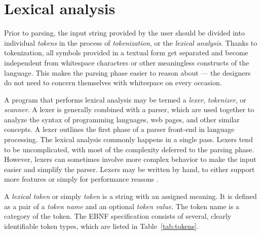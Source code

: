 \documentclass[english,bachelors,forcepolishlogotype]{wizthesis}
\begin{document}
\section{Lexical analysis} \label{sec:lexing}

Prior to parsing, the input string provided by the user should be divided into
individual \emph{tokens} in the process of \emph{tokenization}, or the
\emph{lexical analysis}. Thanks to tokenization, all symbols provided in a
textual form get separated and become independent from whitespace characters or
other meaningless constructs of the language. This makes the parsing phase
easier to reason about --- the designers do not need to concern themselves with
whitespace on every occasion.

A program that performs lexical analysis may be termed a \emph{lexer},
\emph{tokenizer}, or \emph{scanner}. A lexer is generally combined with a
parser, which are used together to analyze the syntax of programming languages,
web pages, and other similar concepts. A lexer outlines the first phase of a
parser front-end in language processing. The lexical analysis commonly happens
in a single pass. Lexers tend to be uncomplicated, with most of the complexity
deferred to the parsing phase. However, lexers can sometimes involve more
complex behavior to make the input easier and simplify the parser. Lexers may be
written by hand, to either support more features or simply for performance
reasons \cite{sipser-2009}.

A \emph{lexical token} or simply \emph{token} is a string with an assigned
meaning. It is defined as a pair of a \emph{token name} and an optional
\emph{token value}. The token name is a category of the token. The EBNF
specification consists of several, clearly identifiable token types, which are
listed in Table~\ref{tab:tokens}.
\end{document}
